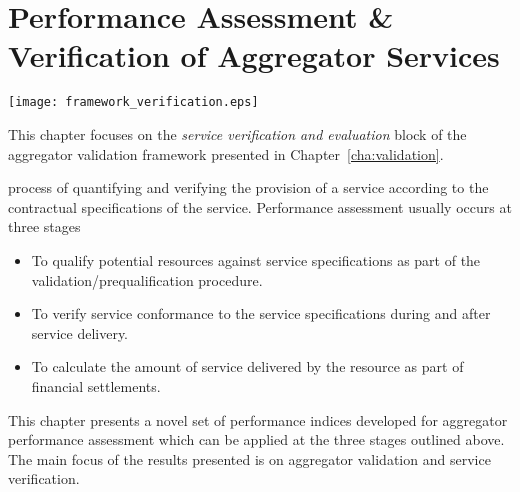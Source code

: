 \chapter{Performance Assessment \& Verification of Aggregator Services} %
\label{cha:verification}
\begin{marginfigure}
	\texttt{[image: framework\_verification.eps]}
	\caption{This chapter focuses on the \emph{service verification and evaluation} block of the aggregator validation framework presented in Chapter~\ref{cha:validation}.}
      \label{fig:frameworkverification}
\end{marginfigure}
 process of quantifying and verifying the provision of a service according to the contractual specifications of the service. Performance assessment usually occurs at three stages
\begin{itemize}
	\item To qualify potential resources against service specifications as part of the validation/prequalification procedure.
	\item To verify service conformance to the service specifications during and after service delivery. 
	\item To calculate the amount of service delivered by the resource as part of financial settlements.
\end{itemize}

This chapter presents a novel set of performance indices developed for aggregator performance assessment which can be applied at the three stages outlined above. The main focus of the results presented is on aggregator validation and service verification.  

